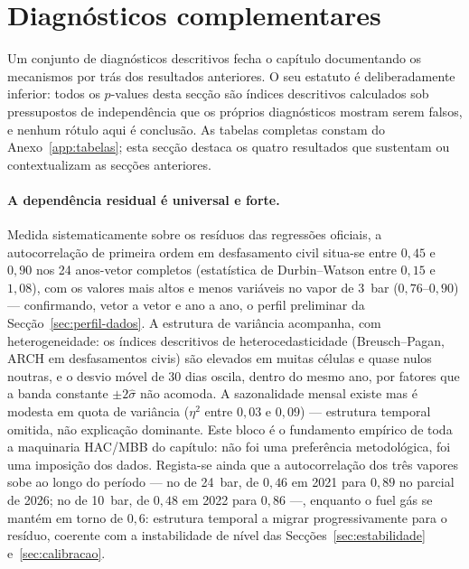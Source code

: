 \section{Diagnósticos complementares}
\label{sec:diagnosticos-desc}


Um conjunto de diagnósticos descritivos fecha o capítulo documentando os
mecanismos por trás dos resultados anteriores. O seu estatuto é
deliberadamente inferior: todos os $p$-values desta secção são índices
descritivos calculados sob pressupostos de independência que os próprios
diagnósticos mostram serem falsos, e nenhum rótulo aqui é conclusão. As tabelas completas constam do Anexo~\ref{app:tabelas};
esta secção destaca os quatro resultados que sustentam ou contextualizam as
secções anteriores.

\paragraph{A dependência residual é universal e forte.} Medida
sistematicamente sobre os resíduos das regressões oficiais, a autocorrelação
de primeira ordem em desfasamento civil situa-se entre $0{,}45$ e $0{,}90$
nos 24 anos-vetor completos (estatística de Durbin--Watson entre $0{,}15$ e
$1{,}08$), com os valores mais altos e menos variáveis no vapor de 3~bar
($0{,}76$--$0{,}90$) --- confirmando, vetor a vetor e ano a ano, o perfil
preliminar da Secção~\ref{sec:perfil-dados}. A estrutura de variância acompanha,
com heterogeneidade: os índices descritivos de heterocedasticidade
(Breusch--Pagan, ARCH em desfasamentos civis) são elevados em muitas células
e quase nulos noutras, e o desvio móvel de 30 dias oscila, dentro do mesmo
ano, por fatores que a banda constante $\pm 2\hat\sigma$ não acomoda. A sazonalidade mensal existe mas é
modesta em quota de variância ($\eta^2$ entre $0{,}03$ e $0{,}09$) ---
estrutura temporal omitida, não explicação dominante. Este bloco é o
fundamento empírico de toda a maquinaria HAC/MBB do capítulo: não foi uma
preferência metodológica, foi uma imposição dos dados. Regista-se ainda que
a autocorrelação dos três vapores sobe ao longo do período --- no de
24~bar, de $0{,}46$ em 2021 para $0{,}89$ no parcial de 2026; no de 10~bar,
de $0{,}48$ em 2022 para $0{,}86$ ---, enquanto o fuel gás se mantém em
torno de $0{,}6$: estrutura temporal a migrar progressivamente para o
resíduo, coerente com a instabilidade de nível das
Secções~\ref{sec:estabilidade} e~\ref{sec:calibracao}.

